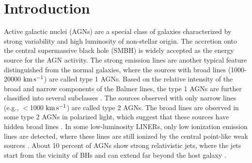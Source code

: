 \documentclass[linenumbers]{aastex631}
\begin{document}

\section{Introduction} \label{sec:intro}

Active galactic nuclei (AGNs) are a special class of galaxies characterized by strong variability and high luminosity of non-stellar origin. The accretion onto the central supermassive black hole (SMBH) is widely accepted as the energy source for the AGN activity. The strong emission lines are another typical feature distinguished from the normal galaxies, where the sources with broad lines (1000-20000 $ \rm{km}\, \rm{s}^{-1}$) are called type 1 AGNs. Based on the relative intensity of the broad and narrow components of the Balmer lines, the type 1 AGNs are further classified into several subclasses \citep[e.g., type 1.5, 1.8, and 1.9, see ][]{1976MNRAS.176P..61O,1981ApJ...249..462O}. The sources observed with only narrow lines (e.g., $<$1000 $ \rm{km}\, \rm{s}^{-1}$) are called type 2 AGNs. The broad lines are observed in some type 2 AGNs in polarized light, which suggest that these sources have hidden broad lines \citep[e.g.,][]{1997Natur.385..700H}. In some low-luminosity LINERs, only low ionization emission lines are detected, where these lines are still ionized by the central point-like weak sources \citep[e.g.,][]{2008ARA&A..46..475H}. About 10 percent of AGNs show strong relativistic jets, where the jets start from the vicinity of BHs and can extend far beyond the host galaxy \citep[e.g., Mpc scale,][]{1989AJ.....98.1195K}. 
 
\end{document}
